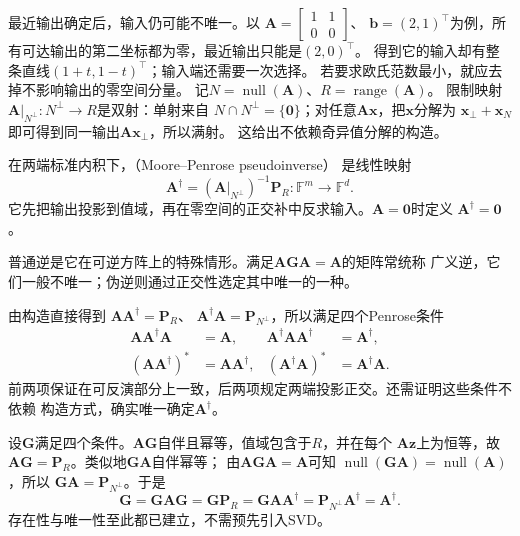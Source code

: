 最近输出确定后，输入仍可能不唯一。以
$\bm A=\left[\begin{smallmatrix}1&1\\0&0\end{smallmatrix}\right]$、
$\bm b=(2,1)^\top$为例，所有可达输出的第二坐标都为零，最近输出只能是$(2,0)^\top$。
得到它的输入却有整条直线$(1+t,1-t)^\top$；输入端还需要一次选择。
若要求欧氏范数最小，就应去掉不影响输出的零空间分量。
记$N=\operatorname{null}(\bm A)$、$R=\operatorname{range}(\bm A)$。
限制映射$\bm A|_{N^\perp}:N^\perp\to R$是双射：单射来自
$N\cap N^\perp=\{\bm0\}$；对任意$\bm A\bm x$，把$\bm x$分解为
$\bm x_\perp+\bm x_N$即可得到同一输出$\bm A\bm x_\perp$，所以满射。
这给出不依赖奇异值分解的构造。

\begin{definition}
\label{def:matrix-analysis-pseudoinverse}
在两端标准内积下，（Moore--Penrose pseudoinverse）
是线性映射
\[
 \bm A^\dagger=(\bm A|_{N^\perp})^{-1}\bm P_R:
 \mathbb F^m\longrightarrow\mathbb F^d.
\]
它先把输出投影到值域，再在零空间的正交补中反求输入。$\bm A=\bm0$时定义
$\bm A^\dagger=\bm0$。
\end{definition}
普通逆是它在可逆方阵上的特殊情形。满足$\bm A\bm G\bm A=\bm A$的矩阵常统称
广义逆，它们一般不唯一；伪逆则通过正交性选定其中唯一的一种。

由构造直接得到
$\bm A\bm A^\dagger=\bm P_R$、
$\bm A^\dagger\bm A=\bm P_{N^\perp}$，所以满足四个Penrose条件
\[
 \begin{aligned}
 \bm A\bm A^\dagger\bm A&=\bm A,&
 \bm A^\dagger\bm A\bm A^\dagger&=\bm A^\dagger,\\
 (\bm A\bm A^\dagger)^*&=\bm A\bm A^\dagger,&
 (\bm A^\dagger\bm A)^*&=\bm A^\dagger\bm A.
 \end{aligned}
\]
前两项保证在可反演部分上一致，后两项规定两端投影正交。还需证明这些条件不依赖
构造方式，确实唯一确定$\bm A^\dagger$。

设$\bm G$满足四个条件。$\bm A\bm G$自伴且幂等，值域包含于$R$，并在每个
$\bm A\bm z$上为恒等，故$\bm A\bm G=\bm P_R$。类似地$\bm G\bm A$自伴幂等；
由$\bm A\bm G\bm A=\bm A$可知
$\operatorname{null}(\bm G\bm A)=\operatorname{null}(\bm A)$，所以
$\bm G\bm A=\bm P_{N^\perp}$。于是
\[
 \bm G=\bm G\bm A\bm G
 =\bm G\bm P_R
 =\bm G\bm A\bm A^\dagger
 =\bm P_{N^\perp}\bm A^\dagger
 =\bm A^\dagger.
\]
存在性与唯一性至此都已建立，不需预先引入SVD。

